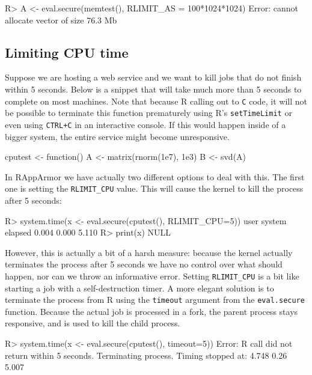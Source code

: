 \documentclass{jss}
\newcommand{\R}{\textsf{R}\xspace}
\begin{document}
\begin{appendices}
\begin{CodeChunk}
\begin{CodeInput}
R> A <- eval.secure(memtest(), RLIMIT_AS = 100*1024*1024)
Error: cannot allocate vector of size 76.3 Mb
\end{CodeInput}
\end{CodeChunk}


\subsection{Limiting CPU time}
\label{cputime}

Suppose we are hosting a web service and we want to kill jobs that do not
finish within 5 seconds. Below is a snippet that will take much more than 5
seconds to complete on most machines. Note that because \R calling out to
\texttt{C} code, it will not be possible to terminate this function prematurely
using R's \texttt{setTimeLimit} or even using \texttt{CTRL+C} in an interactive
console. If this would happen inside of a bigger system, the entire service
might become unresponsive.

\begin{CodeChunk}
\begin{CodeInput}
cputest <- function(){
  A <- matrix(rnorm(1e7), 1e3)
  B <- svd(A)
}
\end{CodeInput}
\end{CodeChunk}
In RAppArmor we have actually two different options to deal with this. The first
one is setting the \texttt{RLIMIT\_CPU} value. This will cause the kernel to
kill the process after 5 seconds:
\begin{CodeChunk}
\begin{CodeInput}
R> system.time(x <- eval.secure(cputest(), RLIMIT_CPU=5))
   user  system elapsed 
  0.004   0.000   5.110 
R> print(x)
NULL
\end{CodeInput}
\end{CodeChunk}
However, this is actually a bit of a harsh measure: because the kernel actually
terminates the process after 5 seconds we have no control over what should
happen, nor can we throw an informative error. Setting \texttt{RLIMIT\_CPU} is
a bit like starting a job with a self-destruction timer. A more elegant
solution is to terminate the process from \R using the \texttt{timeout}
argument from the \texttt{eval.secure} function. Because the actual job is
processed in a fork, the parent process stays responsive, and is used to kill
the child process.
\begin{CodeChunk}
\begin{CodeInput}
R> system.time(x <- eval.secure(cputest(), timeout=5))
Error: R call did not return within 5 seconds. Terminating process.
Timing stopped at: 4.748 0.26 5.007
\end{CodeInput}
\end{CodeChunk}


\end{appendices}
\end{document}
